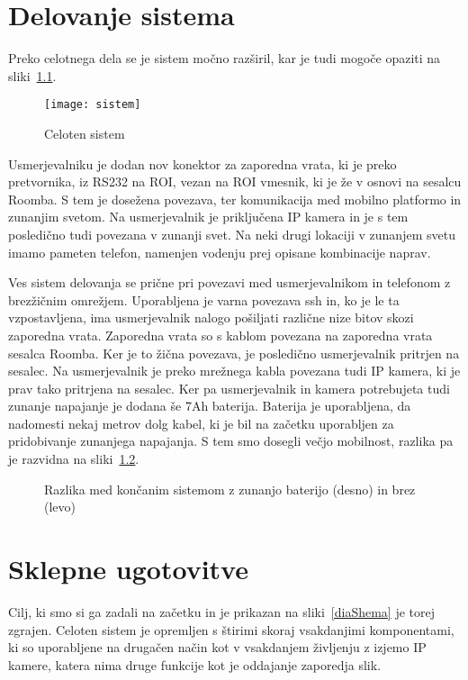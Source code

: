 \documentclass[a4paper, 12pt]{book}
\begin{document}
\chapter{Delovanje sistema}
Preko celotnega dela se je sistem močno razširil, kar je tudi mogoče opaziti na sliki~\ref{diaSistem}. 

\begin{figure}[h]
	\centering
	\texttt{[image: sistem]}
	\caption{Celoten sistem}
	\label{diaSistem}
\end{figure}

Usmerjevalniku je dodan nov konektor za zaporedna vrata, ki je preko pretvornika, iz RS232 na ROI, vezan na ROI vmesnik, ki je že v osnovi na sesalcu Roomba. S tem je dosežena povezava, ter komunikacija med mobilno platformo in zunanjim svetom. Na usmerjevalnik je priključena IP kamera in je s tem posledično tudi povezana v zunanji svet. Na neki drugi lokaciji v zunanjem svetu imamo pameten telefon, namenjen vodenju prej opisane kombinacije naprav.

Ves sistem delovanja se prične pri povezavi med usmerjevalnikom in telefonom z brezžičnim omrežjem. Uporabljena je varna povezava ssh in, ko je le ta vzpostavljena, ima usmerjevalnik nalogo pošiljati različne nize bitov skozi zaporedna vrata. Zaporedna vrata so s kablom povezana na zaporedna vrata sesalca Roomba. Ker je to žična povezava, je posledično usmerjevalnik pritrjen na sesalec. Na usmerjevalnik je preko mrežnega kabla povezana tudi IP kamera, ki je prav tako pritrjena na sesalec. Ker pa usmerjevalnik in kamera potrebujeta tudi zunanje napajanje je dodana še 7Ah baterija. Baterija je uporabljena, da nadomesti nekaj metrov dolg kabel, ki je bil na začetku uporabljen za pridobivanje zunanjega napajanja. S tem smo dosegli večjo mobilnost, razlika pa je razvidna na sliki~\ref{picKoncano}.

\begin{figure}[h]
	\centering
	 \hfill
	 \hfill
	\caption{Razlika med končanim sistemom z zunanjo baterijo (desno) in brez (levo)}
	\label{picKoncano}
\end{figure}

\chapter{Sklepne ugotovitve}
Cilj, ki smo si ga zadali na začetku in je prikazan na sliki~\ref{diaShema} je torej zgrajen. Celoten sistem je opremljen s štirimi skoraj vsakdanjimi komponentami, ki so uporabljene na drugačen način kot v vsakdanjem življenju z izjemo IP kamere, katera nima druge funkcije kot je oddajanje zaporedja slik.
\end{document}
